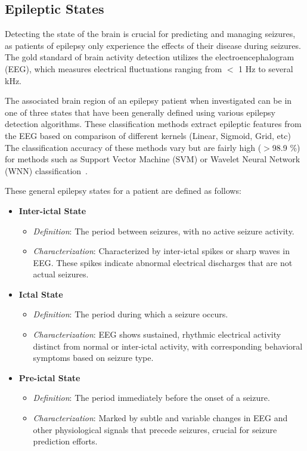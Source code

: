 \subsection{Epileptic States}
Detecting the state of the brain is crucial for predicting and managing seizures, as patients of epilepsy
only experience the effects of their disease during seizures.
The gold standard of brain activity detection utilizes the electroencephalogram (EEG), 
which measures electrical fluctuations ranging from \(<\) 1 Hz to several kHz.

The associated brain region of an epilepsy patient when investigated can be in one of three states that have been generally defined using 
various epilepsy detection algorithms. These classification methods extract epileptic features from the EEG based on comparison of 
different kernels (Linear, Sigmoid, Grid, etc) The classification accuracy of these methods vary but are fairly high (\(>\)98.9 \%) for methods such as
Support Vector Machine (SVM) or Wavelet Neural Network (WNN) classification~\parencite{yayikEpilepticStateDetection2015}.
\pagebreak

These general epilepsy states for a patient are defined as follows:
\begin{itemize}
    \item \textbf{Inter-ictal State}
    \begin{itemize}
        \item \textit{Definition}: The period between seizures, with no active seizure activity.
        \item \textit{Characterization}: Characterized by inter-ictal spikes or sharp waves in EEG\@.
        These spikes indicate abnormal electrical discharges that are not actual seizures.
    \end{itemize}
    \item \textbf{Ictal State}
    \begin{itemize}
        \item \textit{Definition}: The period during which a seizure occurs.
        \item \textit{Characterization}: EEG shows sustained, rhythmic electrical activity distinct from normal or inter-ictal activity, 
        with corresponding behavioral symptoms based on seizure type.
    \end{itemize}
    \item \textbf{Pre-ictal State}
    \begin{itemize}
        \item \textit{Definition}: The period immediately before the onset of a seizure.
        \item \textit{Characterization}: Marked by subtle and variable changes in EEG and other physiological signals that precede seizures, 
        crucial for seizure prediction efforts.
    \end{itemize}
\end{itemize}

